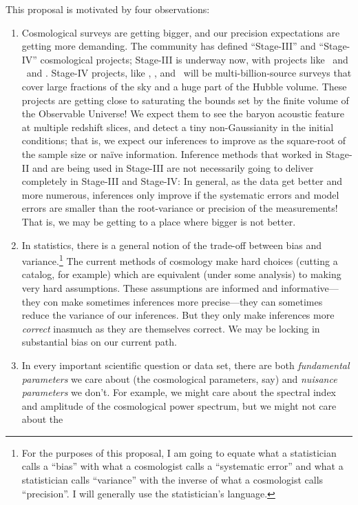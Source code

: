 \documentclass[12pt]{article}
\begin{document}
This proposal is motivated by four observations:
\begin{enumerate}
\item
Cosmological surveys are getting bigger, and our precision expectations
are getting more demanding.
The community has defined ``Stage-III'' and ``Stage-IV'' cosmological
projects; Stage-III is underway now, with projects like \boss\ and \des\ and \panstarrs.
Stage-IV projects, like \lsst, \euclid, and \wfirst\ will be
multi-billion-source surveys that cover large fractions of the sky and
a huge part of the Hubble volume.
These projects are getting close to saturating the bounds set by the
finite volume of the Observable Universe!
We expect them to see the baryon acoustic feature at multiple redshift
slices, and detect a tiny non-Gaussianity in the initial conditions;
that is, we expect our inferences to improve as the square-root of the
sample size or na\"ive information.
Inference methods that worked in Stage-II and are being used in
Stage-III are not necessarily going to deliver completely in Stage-III
and Stage-IV:
In general, as the data get better and more numerous, inferences only
improve if the systematic errors and model errors are smaller than the
root-variance or precision of the measurements!
That is, we may be getting to a place where bigger is not better.
\item
In statistics, there is a general notion of the trade-off between bias
and variance.\footnote{For the purposes of this proposal, I am going to equate what a
statistician calls a ``bias'' with what a cosmologist calls a
``systematic error'' and what a statistician calls ``variance'' with
the inverse of what a cosmologist calls ``precision''.  I will
generally use the statistician's language.}
The current methods of cosmology make hard choices (cutting a catalog,
for example) which are equivalent (under some analysis) to making
very hard assumptions.
These assumptions are informed and informative---they con make sometimes inferences
more precise---they can sometimes reduce the variance of our inferences.
But they only make inferences more \emph{correct} inasmuch as they are
themselves correct.
We may be locking in substantial bias on our current path.
\item
In every important scientific question or data set, there are both
\emph{fundamental parameters} we care about (the cosmological
parameters, say) and \emph{nuisance parameters} we don't.
For example, we might care about the spectral index and amplitude of
the cosmological power spectrum, but we might not care about the

\end{enumerate}
\end{document}

